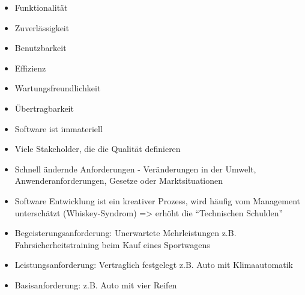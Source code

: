 \documentclass[12pt]{article}
\begin{document}
\begin{note}
\end{note}

\begin{note}

    \begin{field}
        \begin{itemize}
            \item Funktionalität
            \item Zuverlässigkeit
            \item Benutzbarkeit
            \item Effizienz
            \item Wartungsfreundlichkeit
            \item Übertragbarkeit
        \end{itemize}
    \end{field}
\end{note}

\begin{note}

    \begin{field}
        \begin{itemize}
            \item Software ist immateriell
            \item Viele Stakeholder, die die Qualität definieren
            \item Schnell ändernde Anforderungen - Veränderungen in der Umwelt, Anwenderanforderungen, Gesetze oder Marktsituationen
            \item Software Entwicklung ist ein kreativer Prozess, wird häufig vom Management unterschätzt (Whiskey-Syndrom) => erhöht die “Technischen Schulden”
        \end{itemize}
    \end{field}
\end{note}


\begin{note}

    \begin{field}
        \begin{itemize}
            \item Begeisterungsanforderung: Unerwartete Mehrleistungen z.B. Fahrsicherheitstraining beim Kauf eines Sportwagens

            \item Leistungsanforderung: Vertraglich festgelegt z.B. Auto mit Klimaautomatik

            \item Basisanforderung: z.B. Auto mit vier Reifen

        \end{itemize}
    \end{field}
\end{note}
\end{document}
